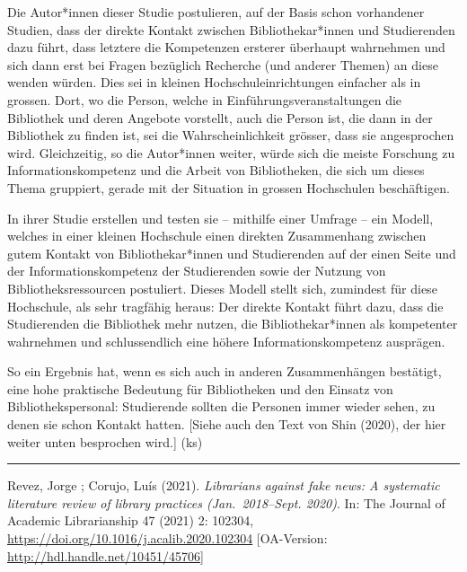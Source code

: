 \documentclass[a4paper,
fontsize=11pt,
oneside,
numbers=noperiodatend,
parskip=half-,
bibliography=totoc,
final
]{scrartcl}
\begin{document}
Die Autor*innen dieser Studie postulieren, auf der Basis schon
vorhandener Studien, dass der direkte Kontakt zwischen
Bibliothekar*innen und Studierenden dazu führt, dass letztere die
Kompetenzen ersterer überhaupt wahrnehmen und sich dann erst bei Fragen
bezüglich Recherche (und anderer Themen) an diese wenden würden. Dies
sei in kleinen Hochschuleinrichtungen einfacher als in grossen. Dort, wo
die Person, welche in Einführungsveranstaltungen die Bibliothek und
deren Angebote vorstellt, auch die Person ist, die dann in der
Bibliothek zu finden ist, sei die Wahrscheinlichkeit grösser, dass sie
angesprochen wird. Gleichzeitig, so die Autor*innen weiter, würde sich
die meiste Forschung zu Informationskompetenz und die Arbeit von
Bibliotheken, die sich um dieses Thema gruppiert, gerade mit der
Situation in grossen Hochschulen beschäftigen.

In ihrer Studie erstellen und testen sie -- mithilfe einer Umfrage --
ein Modell, welches in einer kleinen Hochschule einen direkten
Zusammenhang zwischen gutem Kontakt von Bibliothekar*innen und
Studierenden auf der einen Seite und der Informationskompetenz der
Studierenden sowie der Nutzung von Bibliotheksressourcen postuliert.
Dieses Modell stellt sich, zumindest für diese Hochschule, als sehr
tragfähig heraus: Der direkte Kontakt führt dazu, dass die Studierenden
die Bibliothek mehr nutzen, die Bibliothekar*innen als kompetenter
wahrnehmen und schlussendlich eine höhere Informationskompetenz
ausprägen.

So ein Ergebnis hat, wenn es sich auch in anderen Zusammenhängen
bestätigt, eine hohe praktische Bedeutung für Bibliotheken und den
Einsatz von Bibliothekspersonal: Studierende sollten die Personen immer
wieder sehen, zu denen sie schon Kontakt hatten. {[}Siehe auch den Text
von Shin (2020), der hier weiter unten besprochen wird.{]} (ks)

\begin{center}\rule{0.5\linewidth}{0.5pt}\end{center}

Revez, Jorge ; Corujo, Luís (2021). \emph{Librarians against fake news:
A systematic literature review of library practices (Jan.~2018--Sept.
2020)}. In: The Journal of Academic Librarianship 47 (2021) 2: 102304,
\url{https://doi.org/10.1016/j.acalib.2020.102304} {[}OA-Version:
\url{http://hdl.handle.net/10451/45706}{]}
\end{document}
